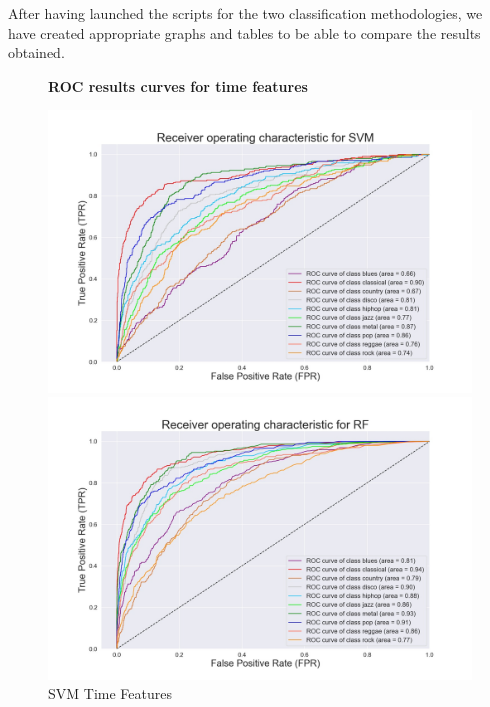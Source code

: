 \documentclass[conference]{IEEEtran}
\begin{document}
\noindent
After having launched the scripts for the two classification methodologies, we have created appropriate graphs and tables to be able to compare the results obtained.

\begin{figure}[!ht]
    \begin{center}
        \small\textbf{ROC results curves for time features}\par\medskip   
        \begin{minipage}[t]{.24\textwidth}
            \centering
            \includegraphics[width=\textwidth]{plot/SL/time_features/SVM_10000_10GEN_GTZAN - ROC Plot.jpg}
            \caption{SVM Time Features}
            \label{fig:SVM Time Features}
        \end{minipage}
        \begin{minipage}[t]{.24\textwidth}
            \centering
            \includegraphics[width=\textwidth]{plot/SL/time_features/RF_10000_10GEN_GTZAN - ROC Plot.jpg}

\end{minipage}
\end{center}
\end{figure}
\end{document}
